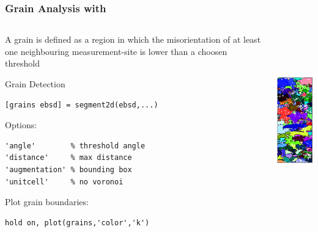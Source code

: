\begin{frame}[fragile]
  \frametitle{Grain Analysis with \mtex}



  \begin{columns}
    \begin{column}{8.5cm}

      A grain is defined as a region in which the mis\-orien\-tation of
      at least one neigh\-bour\-ing meas\-ure\-ment-site is lower than a choosen threshold

\medskip

      Grain Detection

\begin{lstlisting}
[grains ebsd] = segment2d(ebsd,...)
\end{lstlisting}

      \medskip
      Options:
\begin{lstlisting}
'angle'        % threshold angle
'distance'     % max distance
'augmentation' % bounding box
'unitcell'     % no voronoi
\end{lstlisting}

\medskip

Plot grain boundaries:
\begin{lstlisting}
hold on, plot(grains,'color','k')
\end{lstlisting}

\end{column}
    \begin{column}{3.5cm}
      \includegraphics[height=7.5cm]{pic/ebsdgrains}
    \end{column}
  \end{columns}

\end{frame}



